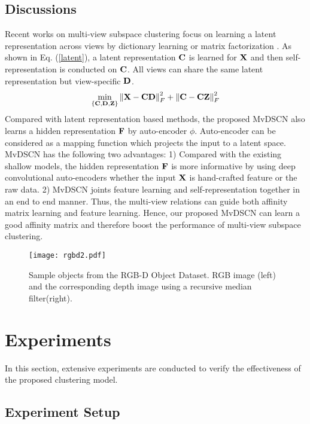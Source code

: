 \documentclass[journal]{IEEEtran}
\begin{document}
\subsection{Discussions}
Recent works on multi-view subspace clustering focus on learning a latent representation across views by dictionary learning or matrix factorization \cite{Zhang2017LatentMS,ZhangGeneralized,Zhao2017MultiViewCV}.
As shown in Eq. (\ref{latent}), a latent representation $\bf{C}$ is learned for $\bf{X}$ and then self-representation is conducted on $\bf{C}$.
All views can share the same latent representation \cite{Zhang2017LatentMS,ZhangGeneralized} but view-specific $\bf{D}$.
\begin{equation}\label{latent}
  \mathop {\min }\limits_{\{ {\bf{C}},{\bf{D}},{\bf{Z}}\} } \left\| {{\bf{X}} - {\bf{CD}}} \right\|_F^2 + \left\| {{\bf{C}} - {\bf{CZ}}} \right\|_F^2
\end{equation}
Compared with latent representation based methods, the proposed MvDSCN also learns a hidden representation $\bf{F}$ by auto-encoder $\phi$.
Auto-encoder can be considered as a mapping function which projects the input to a latent space.
MvDSCN has the following two advantages:
1) Compared with the existing shallow models, the hidden representation $\bf{F}$ is more informative by using deep convolutional auto-encoders
whether the input $\bf{X}$ is hand-crafted feature or the raw data.
2) MvDSCN joints feature learning and self-representation together in an end to end manner. Thus, the multi-view relations can guide both affinity matrix learning and feature learning.
Hence, our proposed MvDSCN can learn a good affinity matrix and therefore boost the performance of multi-view subspace clustering.




\begin{figure}
	\centering
	\texttt{[image: rgbd2.pdf]}
	\caption{Sample objects from the RGB-D Object Dataset. RGB image (left) and the corresponding depth image using a recursive median filter(right).}
	\label{fig:rgbdexample}
\end{figure}

\section{Experiments}
\label{s4}
In this section, extensive experiments are conducted to verify the effectiveness of the proposed clustering model.


\subsection{Experiment Setup}
\end{document}
